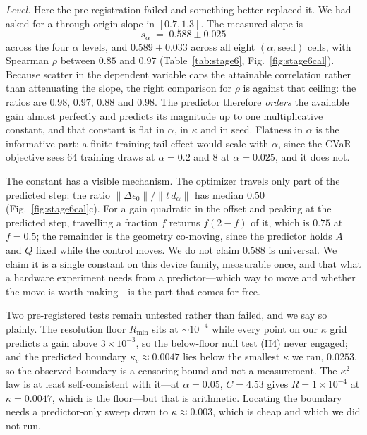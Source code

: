 \documentclass[aps,pra,twocolumn,superscriptaddress,reprint,nofootinbib,floatfix]{revtex4-2}
\theoremstyle{definition}
\begin{document}
\emph{Level.} Here the pre-registration failed and something better replaced
it. We had asked for a through-origin slope in $[0.7,1.3]$. The measured
slope is
\begin{equation}
s_\alpha \;=\; 0.588 \pm 0.025
\label{eq:calib}
\end{equation}
across the four $\alpha$ levels, and $0.589\pm0.033$ across all eight
$(\alpha,\text{seed})$ cells, with Spearman $\rho$ between $0.85$ and $0.97$
(Table~\ref{tab:stage6}, Fig.~\ref{fig:stage6cal}). Because scatter in the
dependent variable caps the attainable correlation rather than attenuating
the slope, the right comparison for $\rho$ is against that ceiling: the
ratios are $0.98$, $0.97$, $0.88$ and $0.98$. The predictor therefore
\emph{orders} the available gain almost perfectly and predicts its magnitude
up to one multiplicative constant, and that constant is flat in $\alpha$,
in $\kappa$ and in seed. Flatness in $\alpha$ is the informative part: a
finite-training-tail effect would scale with $\alpha$, since the CVaR
objective sees $64$ training draws at $\alpha=0.2$ and $8$ at $\alpha=0.025$,
and it does not.

The constant has a visible mechanism. The optimizer travels only part of the
predicted step: the ratio $\|\Delta\epsilon_0\|/\|t\,d_\alpha\|$ has median
$0.50$ (Fig.~\ref{fig:stage6cal}c). For a gain quadratic in the offset and
peaking at the predicted step, travelling a fraction $f$ returns $f(2-f)$ of
it, which is $0.75$ at $f=0.5$; the remainder is the geometry co-moving,
since the predictor holds $A$ and $Q$ fixed while the control moves. We do
not claim $0.588$ is universal. We claim it is a single constant on this
device family, measurable once, and that what a hardware experiment needs
from a predictor---which way to move and whether the move is worth
making---is the part that comes for free.

Two pre-registered tests remain untested rather than failed, and we say so
plainly. The resolution floor $R_{\min}$ sits at $\sim10^{-4}$ while every
point on our $\kappa$ grid predicts a gain above $3\times10^{-3}$, so the
below-floor null test (H4) never engaged; and the predicted boundary
$\kappa_c\approx0.0047$ lies below the smallest $\kappa$ we ran, $0.0253$, so
the observed boundary is a censoring bound and not a measurement. The
$\kappa^2$ law is at least self-consistent with it---at $\alpha=0.05$,
$C=4.53$ gives $R=1\times10^{-4}$ at $\kappa=0.0047$, which is the floor---but
that is arithmetic. Locating the boundary needs a predictor-only sweep down
to $\kappa\approx0.003$, which is cheap and which we did not run.
\end{document}
